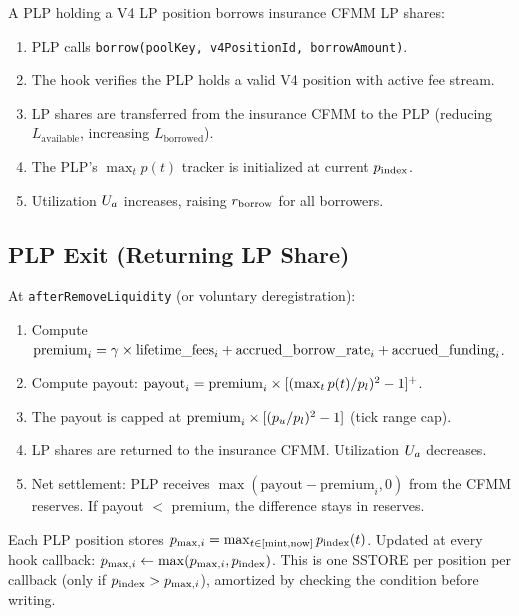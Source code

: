 \begin{definition}\label{def:plp-borrow}
A PLP holding a V4 LP position borrows insurance CFMM LP shares:
\begin{enumerate}[label=(\roman*)]
  \item PLP calls \texttt{borrow(poolKey, v4PositionId, borrowAmount)}.
  \item The hook verifies the PLP holds a valid V4 position with active fee stream.
  \item LP shares are transferred from the insurance CFMM to the PLP
    (reducing $L_{\text{available}}$, increasing $L_{\text{borrowed}}$).
  \item The PLP's $\max_t p(t)$ tracker is initialized at current $p_{\text{index}}$.
  \item Utilization $U_a$ increases, raising $r_{\text{borrow}}$ for all borrowers.
\end{enumerate}
\end{definition}

\subsection{PLP Exit (Returning LP Share)}

\begin{definition}\label{def:plp-exit}
At \texttt{afterRemoveLiquidity} (or voluntary deregistration):
\begin{enumerate}[label=(\roman*)]
  \item Compute $\text{premium}_i = \gamma \times \text{lifetime\_fees}_i
    + \text{accrued\_borrow\_rate}_i + \text{accrued\_funding}_i$.
  \item Compute payout: $\text{payout}_i = \text{premium}_i \times
    [(\max_t p(t) / p_l)^2 - 1]^{+}$.
  \item The payout is capped at $\text{premium}_i \times [(p_u/p_l)^2 - 1]$
    (tick range cap).
  \item LP shares are returned to the insurance CFMM. Utilization $U_a$ decreases.
  \item Net settlement: PLP receives $\max(\text{payout} - \text{premium}_i, 0)$
    from the CFMM reserves. If payout $<$ premium, the difference stays in reserves.
\end{enumerate}
\end{definition}

\begin{remark}
Each PLP position stores $p_{\max,i} = \max_{t \in [\text{mint}, \text{now}]} p_{\text{index}}(t)$.
Updated at every hook callback: $p_{\max,i} \gets \max(p_{\max,i}, p_{\text{index}})$.
This is one SSTORE per position per callback (only if $p_{\text{index}} > p_{\max,i}$),
amortized by checking the condition before writing.
\end{remark}
